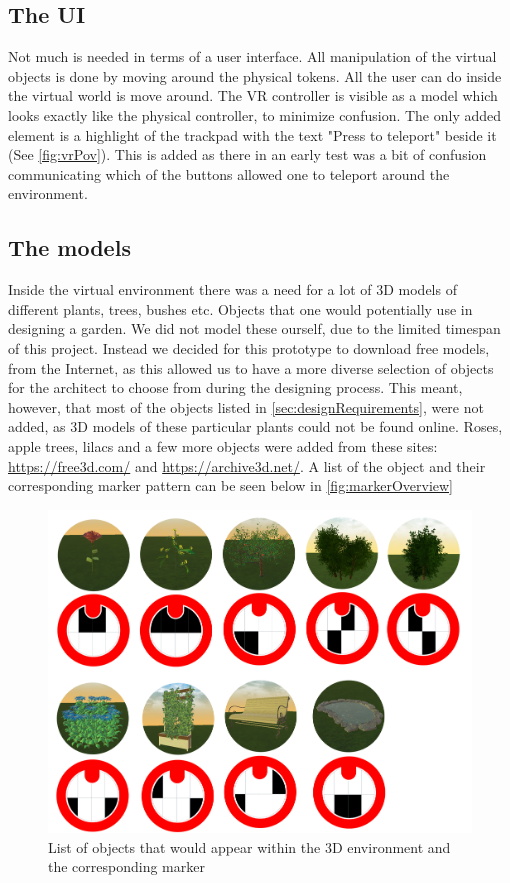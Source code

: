 \subsection{The UI}
\label{sec:designUI}
Not much is needed in terms of a user interface. All manipulation of the virtual objects is done by moving around the physical tokens. All the user can do inside the virtual world is move around. The VR controller is visible as a model which looks exactly like the physical controller, to minimize confusion. The only added element is a highlight of the trackpad with the text "Press to teleport" beside it (See \autoref{fig:vrPov}). This is added as there in an early test was a bit of confusion communicating which of the buttons allowed one to teleport around the environment.

\subsection{The models}
Inside the virtual environment there was a need for a lot of 3D models of different plants, trees, bushes etc. Objects that one would potentially use in designing a garden. We did not model these ourself, due to the limited timespan of this project. Instead we decided for this prototype to download free models, from the Internet, as this allowed us to have a more diverse selection of objects for the architect to choose from during the designing process. This meant, however, that most of the objects listed in \autoref{sec:designRequirements}, were not added, as 3D models of these particular plants could not be found online. Roses, apple trees, lilacs and a few more objects were added from these sites: \url{https://free3d.com/} and \url{https://archive3d.net/}. A list of the object and their corresponding marker pattern can be seen below in \autoref{fig:markerOverview}

\begin{figure}[H]
	\centering
	\includegraphics[width=0.9\linewidth]{figure/Appendices/markersOverview.png}
	\caption{List of objects that would appear within the 3D environment and the corresponding marker}
	\label{fig:markerOverview}
\end{figure}








